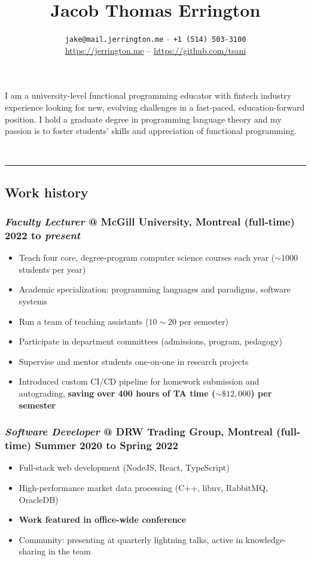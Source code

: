 \documentclass{article}
\title{\vspace{-1.5em}\textbf{Jacob Thomas Errington}}
\author{%
  \texttt{jake@mail.jerrington.me} -- \texttt{+1 (514) 503-3100} \\
  \url{https://jerrington.me} -- \url{https://github.com/tsani}
}
\date{}
\newcommand\jobtitle\textit
\providecommand{\tightlist}{%
  \setlength{\itemsep}{0pt}\setlength{\parskip}{0pt}}
\begin{document}
\maketitle

I am a university-level functional programming educator with fintech industry experience
looking for new, evolving challenges in a fast-paced, education-forward position. I hold a graduate
degree in programming language theory and my passion is to foster students' skills and appreciation
of functional programming.

~\\

\hrule

\subsection*{Work history}

\subsubsection*{%
  \jobtitle{Faculty Lecturer} @ McGill University, Montreal (full-time)
  \hfill 2022 to \emph{present}
}
\begin{itemize}
    \tightlist
  \item Teach four core, degree-program computer science courses each year ($\sim 1000$ students per year)
  \item Academic specialization: programming languages and paradigms, software systems
  \item Run a team of teaching assistants ($10\sim20$ per semester)
  \item Participate in department committees (admissions, program, pedagogy)
  \item Supervise and mentor students one-on-one in research projects
  \item Introduced custom CI/CD pipeline for homework submission and autograding,
    \textbf{saving over 400 hours of TA time ($\sim \$12,000$) per semester}
\end{itemize}

\subsubsection*{%
  \jobtitle{Software Developer} @ DRW Trading Group, Montreal (full-time)
  \hfill Summer 2020 to Spring 2022
}
\begin{itemize}
    \tightlist
  \item Full-stack web development (NodeJS, React, TypeScript)
  \item High-performance market data processing (C++, libuv, RabbitMQ, OracleDB)
  \item \textbf{Work featured in office-wide conference}
  \item Community: presenting at quarterly lightning talks, active in knowledge-sharing in the team
\end{itemize}
\end{document}
